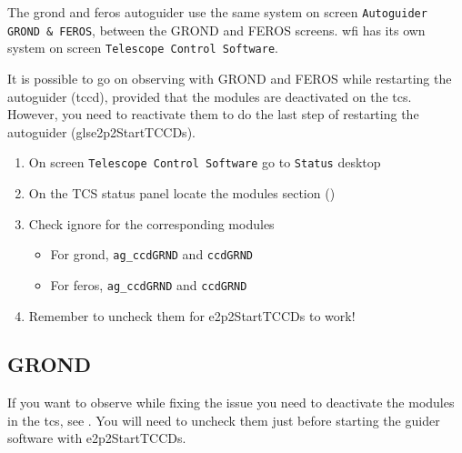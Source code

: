\documentclass[11pt,fleqn,a4paper]{book}
\begin{document}
The \gls{grond} and \gls{feros} autoguider use the same system on screen \texttt{Autoguider GROND \& FEROS}, between the GROND and FEROS screens.  \gls{wfi} has its own system on screen \texttt{Telescope Control Software}.

It is possible to go on observing with GROND and FEROS while restarting the autoguider (\acrlong{tccd}), provided that the modules are deactivated on the \gls{tcs}. However, you need to reactivate them to do the last step of restarting the autoguider (gls{e2p2StartTCCDs}).

\label{proc:agmodules}
\begin{enumerate}
    \item On screen \texttt{Telescope Control Software} go to \texttt{Status} \gls{desktop}
    \item On the \gls{TCS status panel} locate the modules section ()
    \item Check ignore for the corresponding modules
    \begin{itemize}
        \item For \gls{grond}, \texttt{ag\_ccdGRND} and \texttt{ccdGRND}
        \item For \gls{feros}, \texttt{ag\_ccdGRND} and \texttt{ccdGRND}
    \end{itemize}
    \item Remember to uncheck them for \gls{e2p2StartTCCDs} to work!
\end{enumerate}

\subsection{GROND}
If you want to observe while fixing the issue you need to deactivate the modules in the \gls{tcs}, see .  You will need to uncheck them just before starting the guider software with \gls{e2p2StartTCCDs}.
\end{document}
